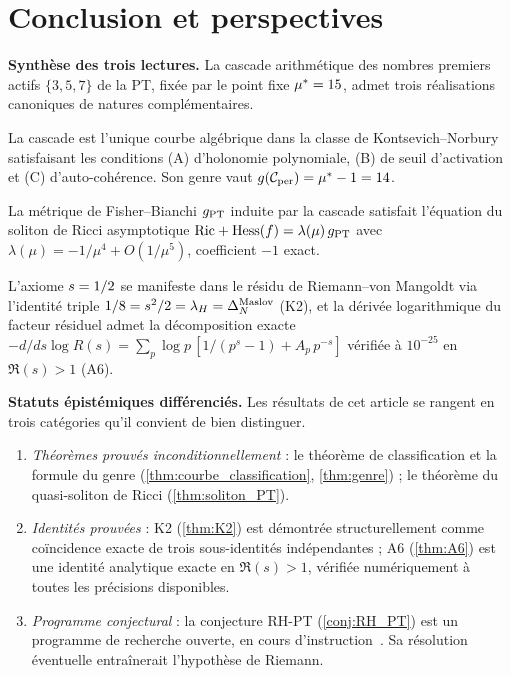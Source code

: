 \section{Conclusion et perspectives}
\label{sec:conclusion2}

\textbf{Synthèse des trois lectures.} La cascade arithmétique des nombres premiers actifs $\{3, 5, 7\}$ de la PT, fixée par le point fixe $\mu^{*} = 15$, admet trois réalisations canoniques de natures complémentaires.
\begin{description}[nosep,leftmargin=*]
\item[Lecture algébro-géométrique (\ref{sec:courbe}).] La cascade est l'unique courbe algébrique dans la classe de Kontsevich--Norbury satisfaisant les conditions (A) d'holonomie polynomiale, (B) de seuil d'activation et (C) d'auto-cohérence. Son genre vaut $g(\mathcal{C}_{\rm per}) = \mu^{*} - 1 = 14$.
\item[Lecture différentielle (\ref{sec:soliton}).] La métrique de Fisher--Bianchi $g_{\rm PT}$ induite par la cascade satisfait l'équation du soliton de Ricci asymptotique $\mathrm{Ric} + \mathrm{Hess}(f) = \lambda(\mu)\, g_{\rm PT}$ avec $\lambda(\mu) = -1/\mu^{4} + O(1/\mu^{5})$, coefficient $-1$ exact.
\item[Lecture spectrale (\ref{sec:spectrales}).] L'axiome $s = 1/2$ se manifeste dans le résidu de Riemann--von Mangoldt via l'identité triple $1/8 = s^{2}/2 = \lambda_H = \Delta_N^{\rm Maslov}$ (K2), et la dérivée logarithmique du facteur résiduel admet la décomposition exacte $-d/ds \log R(s) = \sum_p \log p\,[1/(p^{s} - 1) + A_p\,p^{-s}]$ vérifiée à $10^{-25}$ en $\Re(s) > 1$ (A6).
\end{description}

\textbf{Statuts épistémiques différenciés.} Les résultats de cet article se rangent en trois catégories qu'il convient de bien distinguer.
\begin{enumerate}[nosep,leftmargin=*]
\item \emph{Théorèmes prouvés inconditionnellement} : le théorème de classification et la formule du genre (\ref{thm:courbe_classification}, \ref{thm:genre}) ; le théorème du quasi-soliton de Ricci (\ref{thm:soliton_PT}).
\item \emph{Identités prouvées} : K2 (\ref{thm:K2}) est démontrée structurellement comme coïncidence exacte de trois sous-identités indépendantes ; A6 (\ref{thm:A6}) est une identité analytique exacte en $\Re(s) > 1$, vérifiée numériquement à toutes les précisions disponibles.
\item \emph{Programme conjectural} : la conjecture RH-PT (\ref{conj:RH_PT}) est un programme de recherche ouverte, en cours d'instruction~\cite{PT_NewMath_Consolidation}. Sa résolution éventuelle entraînerait l'hypothèse de Riemann.
\end{enumerate}

